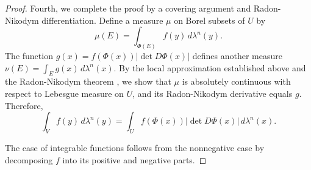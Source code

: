 \begin{proof}
Fourth, we complete the proof by a covering argument and Radon-Nikodym differentiation. Define a measure $\mu$ on Borel subsets of $U$ by
$$\mu(E) = \int_{\Phi(E)} f(y)\,d\lambda^n(y).$$
The function $g(x) = f(\Phi(x)) |\det D\Phi(x)|$ defines another measure $\nu(E) = \int_E g(x)\,d\lambda^n(x)$. By the local approximation established above and the Radon-Nikodym theorem , we show that $\mu$ is absolutely continuous with respect to Lebesgue measure on $U$, and its Radon-Nikodym derivative equals $g$. Therefore,
$$\int_V f(y)\,d\lambda^n(y) = \int_U f(\Phi(x)) |\det D\Phi(x)|\,d\lambda^n(x).$$

The case of integrable functions follows from the nonnegative case by decomposing $f$ into its positive and negative parts.
\end{proof}

